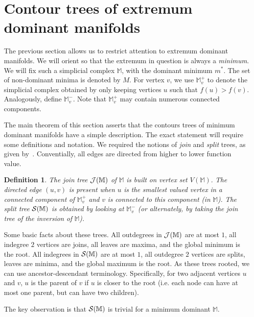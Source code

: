 \documentclass[11pt]{article}
\newtheorem{definition}[theorem]{Definition}
\theoremstyle{definition}
\newcommand{\cJ}{{\cal J}}
\newcommand{\cS}{{\cal S}}
\newcommand{\MM}{\mathbb{M}}
\begin{document}
\section{Contour trees of extremum dominant manifolds} \label{sec:paint}

The previous section allows us to restrict attention to extremum dominant manifolds.
We will orient so that the extremum in question is always a \emph{minimum}.
We will fix such a simplicial complex $\MM$, with the dominant minimum $m^*$. 
The set of non-dominant minima is denoted by $M$.
For vertex $v$, we use $\MM^+_v$ to denote the simplicial complex obtained by only
keeping vertices $u$ such that $f(u) > f(v)$. Analogously, define $\MM^-_v$. Note that $\MM^+_v$ may contain
numerous connected components. 

The main theorem of this section asserts that the contours trees of minimum dominant manifolds have a simple description.
The exact statement will require some definitions and notation.
We required the notions of \emph{join} and \emph{split} trees, as given by~\cite{csa-cctad-00}.
Conventially, all edges are directed from higher to lower function value. 

\begin{definition} \label{join} The join tree $\cJ(\MM)$ of $\MM$ is built on vertex set $V(\MM)$.
The directed edge $(u,v)$ is present when $u$ is the smallest valued vertex in a connected component of $\MM^+_v$
\emph{and} $v$ is connected to this component (in $\MM$). The split tree $\cS(\MM)$ is obtained
by looking at $\MM^-_v$ (or alternately, by taking the join tree of the inversion of $\MM$). 
\end{definition}


Some basic facts about these trees. 
All outdegrees in $\cJ(\MM)$ are at most $1$, all indegree $2$ vertices are joins, all leaves are maxima,
and the global minimum is the root. All indegrees in $\cS(\MM)$ are at most $1$, all outdegree $2$
vertices are splits, leaves are minima, and the global maximum is the root.
%
As these trees rooted, we can use ancestor-descendant terminology.  
Specifically, for two adjacent vertices $u$ and $v$, $u$ is the parent of $v$ if $u$ is closer to the root 
(i.e. each node can have at most one parent, but can have two children).  


The key observation is that $\cS(\MM)$ is trivial for a minimum dominant $\MM$.
\end{document}
